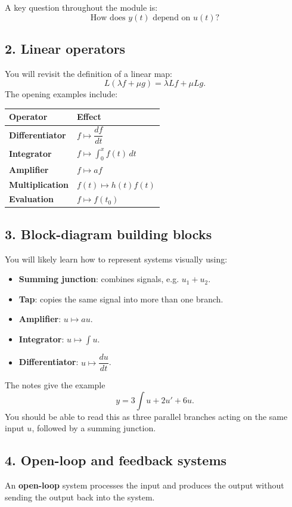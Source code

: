 \documentclass[11pt,a4paper]{article}
\begin{document}
A key question throughout the module is:
\[
\boxed{\text{How does }y(t)\text{ depend on }u(t)?}
\]

\subsection*{2. Linear operators}
You will revisit the definition of a linear map:
\[
L(\lambda f+\mu g)=\lambda Lf+\mu Lg.
\]
The opening examples include:
\begin{center}
\begin{tabular}{>{\bfseries}p{4cm}p{8.5cm}}
\toprule
Operator & Effect \\
\midrule
Differentiator & $f\mapsto \dfrac{df}{dt}$ \\
Integrator & $f\mapsto \displaystyle\int_0^x f(t)\,dt$ \\
Amplifier & $f\mapsto af$ \\
Multiplication & $f(t)\mapsto h(t)f(t)$ \\
Evaluation & $f\mapsto f(t_0)$ \\
\bottomrule
\end{tabular}
\end{center}

\subsection*{3. Block-diagram building blocks}
You will likely learn how to represent systems visually using:
\begin{itemize}[leftmargin=1.5em]
\item \textbf{Summing junction}: combines signals, e.g. $u_1+u_2$.
\item \textbf{Tap}: copies the same signal into more than one branch.
\item \textbf{Amplifier}: $u\mapsto au$.
\item \textbf{Integrator}: $u\mapsto \int u$.
\item \textbf{Differentiator}: $u\mapsto \dfrac{du}{dt}$.
\end{itemize}

\begin{examplebox}
The notes give the example
\[
y=3\int u+2u'+6u.
\]
You should be able to read this as three parallel branches acting on the same input $u$, followed by a summing junction.
\end{examplebox}

\subsection*{4. Open-loop and feedback systems}
An \textbf{open-loop} system processes the input and produces the output without sending the output back into the system.
\end{document}
